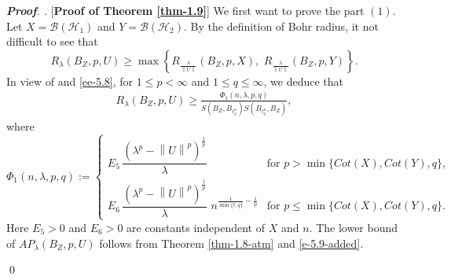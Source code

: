 \documentclass[a4paper,11pt, reqno]{amsart}
\theoremstyle{definition}
\newenvironment{pf}[1][]{%
	\vskip 3mm
	\noindent
	\ifthenelse{\equal{#1}{}}%
	{{\slshape {\bf Proof}. }}%
	{{\slshape #1.} }%
}%
{\qed\bigskip}
\newcommand{\norm}[1]{\left\lVert#1\right\rVert}
\begin{document}
\begin{pf} [{\bf Proof of Theorem \ref{thm-1.9}}]
We first want to prove the part $(1)$. Let $X=\mathcal{B}(\mathcal{H}_1)$ and $Y=\mathcal{B}(\mathcal{H}_2)$. By the definition of Bohr radius, it not difficult to see that
\begin{equation} \label{ee-5.8}
R_{\lambda}(B_{Z}, p,U) \geq \max\left\{R_{\frac{\lambda}{\norm{U}}}(B_{Z}, p,X), \, \, R_{\frac{\lambda}{\norm{U}}}(B_{Z}, p,Y)\right\}.
\end{equation}
In view of \cite[Theorem 1.5]{Himadri-local-Banach-1} and \eqref{ee-5.8}, for $1\leq p<\infty$ and $1 \leq q \leq \infty $, we deduce that
\begin{align} \label{e-5.9-added}
R_{\lambda}(B_{Z}, p,U) \geq \frac{\Phi_{1}(n,\lambda,p,q)}{S(B_{Z},B_{\ell^n _q})S(B_{\ell^n _q},B_{Z})},
\end{align} 
where
\begin{equation*}
\Phi_{1}(n,\lambda,p,q):=	\begin{cases}
	
	E_{5}\,\dfrac{\left(\lambda^p -\norm{U}^p\right)^{\frac{1}{p}}}{\lambda} & \text{for $p>\min \{Cot(X),Cot(Y),q\}$}, \\[2mm]
	E_{6}\, \dfrac{\left(\lambda^p -\norm{U}^p\right)^{\frac{1}{p}}}{\lambda}\,\, n^{{\frac{1}{\min\{t,q\}}}-\frac{1}{p}} & \text{for $p\leq \min \{Cot(X),Cot(Y),q\}$}.
\end{cases}
\end{equation*}
 Here $E_{5}>0$ and $E_{6}>0$ are constants independent of $X$ and $n$. The lower bound of $AP_{\lambda}(B_{Z}, p,U)$ follows from Theorem \ref{thm-1.8-atm} and \eqref{e-5.9-added}.
 

\end{pf}
\end{document}
